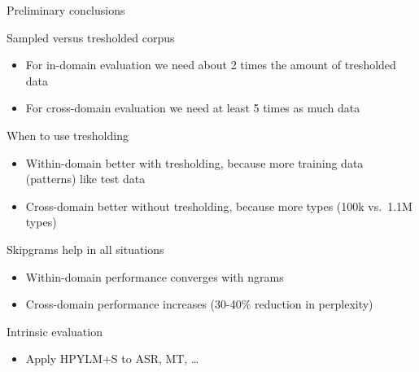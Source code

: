 \documentclass[department=cls, notes={hide notes}, official=true]{beamerruhuisstijl}
\begin{document}
\begin{frame}{Preliminary conclusions}

\begin{block}{Sampled versus tresholded corpus}
\begin{itemize}
\item For in-domain evaluation we need about 2 times the amount of tresholded data
\item For cross-domain evaluation we need at least 5 times as much data
\end{itemize}
\end{block}

\begin{block}{When to use tresholding}
\begin{itemize}
\item Within-domain better with tresholding, because more training data (patterns) like test data
\item Cross-domain better without tresholding, because more types (100k vs.\ 1.1M types)
\end{itemize}
\end{block}

\begin{block}{Skipgrams help in all situations}
\begin{itemize}
\item Within-domain performance converges with ngrams
\item Cross-domain performance increases (30-40\% reduction in perplexity)
\end{itemize}
\end{block}

\begin{block}{Intrinsic evaluation}
	\begin{itemize}
    	\item Apply HPYLM+S to ASR, MT, \ldots
    \end{itemize}
\end{block}

\end{frame}
\end{document}
